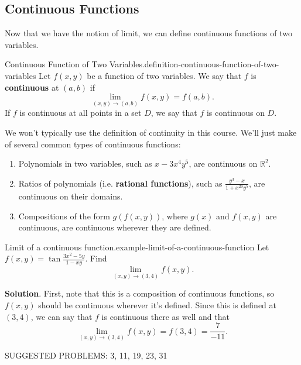 \documentclass[10pt,]{book}
\newcommand{\terminology}[1]{\textbf{#1}}
\numberwithin{equation}{section}
\newcommand{\RR}{\mathbb{R}}
\begin{document}
\subsection[{Continuous Functions}]{Continuous Functions}\label{subsection-continuous-functions}
\hypertarget{p-1348}{}%
Now that we have the notion of limit, we can define continuous functions of two variables.%
\begin{definition}{Continuous Function of Two Variables.}{definition-continuous-function-of-two-variables}%
\hypertarget{p-1349}{}%
Let \(f(x,y)\) be a function of two variables. We say that \(f\) is \terminology{continuous} at \((a,b)\) if%
\begin{equation*}
\lim_{(x,y)\to(a,b)}f(x,y) = f(a,b).
\end{equation*}
If \(f\) is continuous at all points in a set \(D\), we say that \(f\) is continuous on \(D\).%
\end{definition}
\hypertarget{p-1350}{}%
We won't typically use the definition of continuity in this course. We'll just make of several common types of continuous functions:%
\leavevmode%
\begin{enumerate}
\item\hypertarget{li-134}{}Polynomials in two variables, such as \(x-3x^{4}y^{5}\), are continuous on \(\RR^{2}\).%
\item\hypertarget{li-135}{}Ratios of polynomials (i.e. \terminology{rational functions}), such as \(\frac{y^{3}-x}{1+x^{20}y^{5}}\), are continuous on their domains.%
\item\hypertarget{li-136}{}Compositions of the form \(g(f(x,y))\), where \(g(x)\) and \(f(x,y)\) are continuous, are continuous wherever they are defined.%
\end{enumerate}
\begin{example}{Limit of a continuous function.}{example-limit-of-a-continuous-function}%
\hypertarget{p-1351}{}%
Let \(f(x,y) = \tan\frac{3x^{2}-5y}{1-xy}\). Find%
\begin{equation*}
\lim_{(x,y)\to(3,4)}f(x,y).
\end{equation*}
%
\par\smallskip%
\noindent\textbf{Solution}.\hypertarget{solution-216}{}\quad%
\hypertarget{p-1352}{}%
First, note that this is a composition of continuous functions, so \(f(x,y)\) should be continuous wherever it's defined. Since this is defined at \((3,4)\), we can say that \(f\) is continuous there as well and that%
\begin{equation*}
\lim_{(x,y)\to(3,4)}f(x,y) = f(3,4) = \frac{7}{-11}.
\end{equation*}
%
\end{example}
\hypertarget{p-1353}{}%
SUGGESTED PROBLEMS: 3, 11, 19, 23, 31%
%
%
\typeout{************************************************}
\typeout{************************************************}
%
\end{document}
